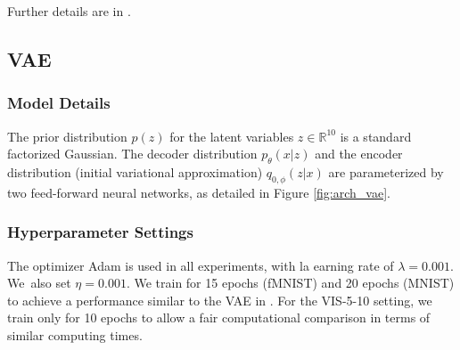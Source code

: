Further details are in \parencite{west1998bayesian}.
\iffalse
\subsubsection{Model Details} The definition of the HMM and the DLM can be found in Figures \ref{fig:hmm} and \ref{fig:dlm}, respectively.

\begin{figure}[!htp]
\centering
\RecustomVerbatimEnvironment{Verbatim}{BVerbatim}{}
\inputminted[fontsize=\scriptsize]{python}{./hmm.tex}
\caption{Model architecture for the HMM.}
\label{fig:hmm}
\end{figure}

\begin{figure}[!htp]
\centering
\RecustomVerbatimEnvironment{Verbatim}{BVerbatim}{}
\inputminted[fontsize=\scriptsize]{python}{./dlm.tex}
\caption{Model architecture for the DLM.}
\label{fig:dlm}
\end{figure}
\fi

\subsection{VAE}

\subsubsection{Model Details}

The prior distribution $p(z)$ for the latent variables $z \in \mathbb{R}^{10}$ is a standard factorized Gaussian. The decoder distribution $p_\theta(x|z)$ and the encoder distribution (initial variational approximation) $q_{0,\phi}(z|x)$ are parameterized by two feed-forward neural networks, as 
detailed in Figure \ref{fig:arch_vae}.



\subsubsection{Hyperparameter Settings}
The optimizer Adam is used in all experiments, with 
la earning rate of $\lambda=0.001$. We~also set $\eta = 0.001$. We train for 15 epochs (fMNIST) and 20 epochs (MNIST) to achieve a performance 
similar to the VAE in \parencite{pmlr-v89-titsias19a}. For the VIS-5-10 setting, we train only for 10 epochs to allow a fair computational comparison in terms of similar computing times.


